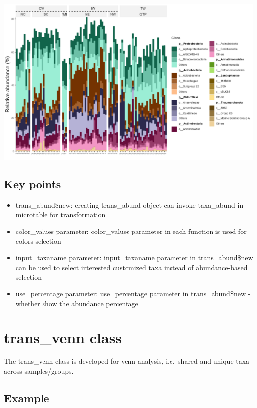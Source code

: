 \documentclass[
]{book}
\providecommand{\tightlist}{%
  \setlength{\itemsep}{0pt}\setlength{\parskip}{0pt}}
\begin{document}
\begin{center}\includegraphics[width=700px]{Images/trans_abund_barplot_ggnested} \end{center}

\hypertarget{key-points-1}{%
\subsection{Key points}\label{key-points-1}}

\begin{itemize}
\tightlist
\item
  trans\_abund\$new: creating trans\_abund object can invoke taxa\_abund in microtable for transformation
\item
  color\_values parameter: color\_values parameter in each function is used for colors selection
\item
  input\_taxaname parameter: input\_taxaname parameter in trans\_abund\$new can be used to select interested customized taxa instead of abundance-based selection
\item
  use\_percentage parameter: use\_percentage parameter in trans\_abund\$new - whether show the abundance percentage
\end{itemize}

\hypertarget{trans_venn-class}{%
\section{trans\_venn class}\label{trans_venn-class}}

The trans\_venn class is developed for venn analysis, i.e.~shared and unique taxa across samples/groups.

\hypertarget{example-1}{%
\subsection{Example}\label{example-1}}
\end{document}
